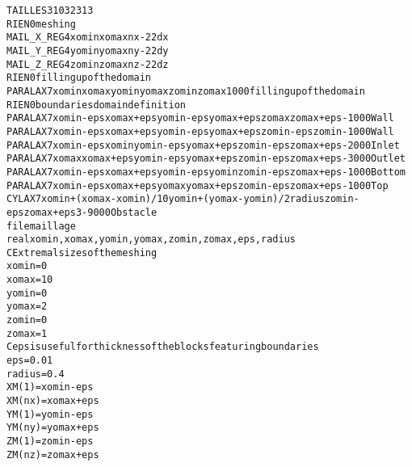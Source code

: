 \begin{alltt}
TAILLES 3 103 23 13 
RIEN 0 meshing
MAIL_X_REG 4 xomin xomax nx-2 2 dx
MAIL_Y_REG 4 yomin yomax ny-2 2 dy
MAIL_Z_REG 4 zomin zomax nz-2 2 dz
RIEN 0 filling up of the domain
PARALAX 7 xomin xomax yomin yomax zomin zomax 1000 filling up of the domain
RIEN 0 boundaries domain definition
PARALAX 7 xomin-eps xomax+eps yomin-eps yomax+eps zomax zomax+eps -1000 Wall
PARALAX 7 xomin-eps xomax+eps yomin-eps yomax+eps zomin-eps zomin -1000 Wall
PARALAX 7 xomin-eps xomin yomin-eps yomax+eps zomin-eps zomax+eps -2000 Inlet
PARALAX 7 xomax xomax+eps yomin-eps yomax+eps zomin-eps zomax+eps -3000 Outlet
PARALAX 7 xomin-eps xomax+eps yomin-eps yomin zomin-eps zomax+eps -1000 Bottom
PARALAX 7 xomin-eps xomax+eps yomax yomax+eps zomin-eps zomax+eps -1000 Top
CYLAX 7 xomin+(xomax-xomin)/10 yomin+(yomax-yomin)/2 radius zomin-eps zomax+eps 3 -9000 Obstacle
file maillage
        real xomin,xomax,yomin,yomax,zomin,zomax,eps,radius
C       Extremal sizes of the meshing
        xomin=0
        xomax=10
        yomin=0
        yomax=2
        zomin=0
        zomax=1
C       eps is useful for thickness of the blocks featuring boundaries
        eps=0.01
        radius=0.4
        XM(1)=xomin-eps
        XM(nx)=xomax+eps
        YM(1)=yomin-eps
        YM(ny)=yomax+eps
        ZM(1)=zomin-eps
        ZM(nz)=zomax+eps
\end{alltt}
